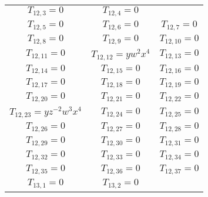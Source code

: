 \begin{longtable}{|c|c|c|}
$T_{12,3}= 0$&

$T_{12,4}= 0$\\

$T_{12,5}= 0$&

$T_{12,6}= 0$&

$T_{12,7}= 0$\\

$T_{12,8}= 0$&

$T_{12,9}= 0$&

$T_{12,10}= 0$\\

$T_{12,11}= 0$&

$T_{12,12}= yw^2x^4$&

$T_{12,13}= 0$\\

$T_{12,14}= 0$&

$T_{12,15}= 0$&

$T_{12,16}= 0$\\

$T_{12,17}= 0$&

$T_{12,18}= 0$&

$T_{12,19}= 0$\\

$T_{12,20}= 0$&

$T_{12,21}= 0$&

$T_{12,22}= 0$\\

$T_{12,23}= yz^{-2}w^3x^4$&

$T_{12,24}= 0$&

$T_{12,25}= 0$\\

$T_{12,26}= 0$&

$T_{12,27}= 0$&

$T_{12,28}= 0$\\

$T_{12,29}= 0$&

$T_{12,30}= 0$&

$T_{12,31}= 0$\\

$T_{12,32}= 0$&

$T_{12,33}= 0$&

$T_{12,34}= 0$\\

$T_{12,35}= 0$&

$T_{12,36}= 0$&

$T_{12,37}= 0$\\

$T_{13,1}= 0$&

$T_{13,2}= 0$&


\end{longtable}
